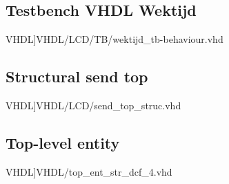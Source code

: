 \subsection{Testbench VHDL Wektijd}
\scriptsize 
 VHDL]{VHDL/LCD/TB/wektijd_tb-behaviour.vhd}
\normalsize
\label{code:tb_wektijd}

\subsection{Structural send top}
\scriptsize 
 VHDL]{VHDL/LCD/send_top_struc.vhd}
\normalsize
\label{code:tb_send_top}


\subsection{Top-level entity}
\scriptsize 
 VHDL]{VHDL/top_ent_str_dcf_4.vhd}
\label{code:top-level-entity}
\normalsize